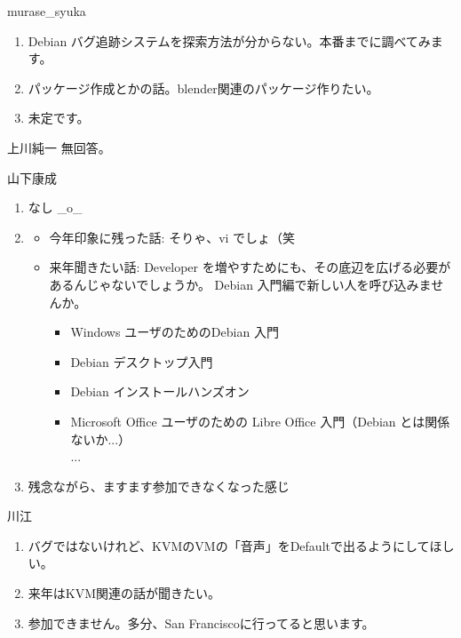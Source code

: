 \documentclass[mingoth,a4paper]{jsarticle}
\begin{document}
\begin{prework}{ murase\_syuka }
  \begin{enumerate}
  \item Debian バグ追跡システムを探索方法が分からない。本番までに調べてみます。
  \item パッケージ作成とかの話。blender関連のパッケージ作りたい。
  \item 未定です。
  \end{enumerate}
\end{prework}

\begin{prework}{ 上川純一 }
  無回答。
\end{prework}

\begin{prework}{ 山下康成 }
  \begin{enumerate}
  \item なし \_o\_
  \item
    \begin{itemize}
    \item 今年印象に残った話: そりゃ、vi でしょ（笑
    \item 来年聞きたい話:
      Developer を増やすためにも、その底辺を広げる必要があるんじゃないでしょうか。
      Debian 入門編で新しい人を呼び込みませんか。
      \begin{itemize}
      \item Windows ユーザのためのDebian 入門
      \item Debian デスクトップ入門
      \item Debian インストールハンズオン
      \item Microsoft Office ユーザのための Libre Office 入門（Debian とは関係ないか...）
        \\ ...
      \end{itemize}
    \end{itemize}
  \item 残念ながら、ますます参加できなくなった感じ
  \end{enumerate}
\end{prework}

\begin{prework}{ 川江 }
  \begin{enumerate}
  \item バグではないけれど、KVMのVMの「音声」をDefaultで出るようにしてほしい。
  \item 来年はKVM関連の話が聞きたい。
  \item 参加できません。多分、San Franciscoに行ってると思います。
  \end{enumerate}
\end{prework}
\end{document}
